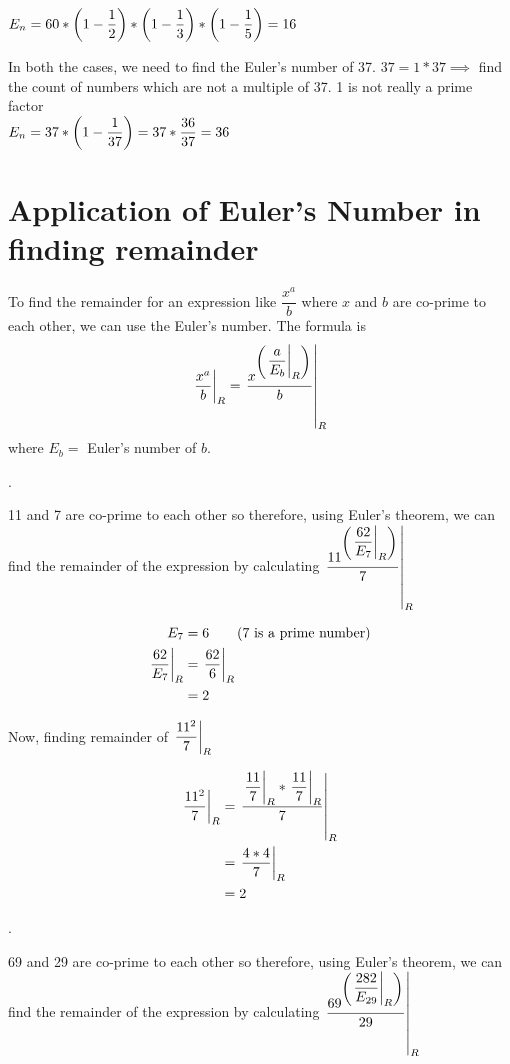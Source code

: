 $E_n = 60 * \left ( 1 - \dfrac{1}{2} \right ) * \left ( 1 - \dfrac{1}{3} \right ) * \left ( 1 - \dfrac{1}{5} \right ) = 16$


In both the cases, we need to find the Euler's number of 37. $37 = 1 * 37 \implies$ find the count of numbers which are not a multiple of 37. 1 is not really a prime factor \\

$E_n = 37 * \left ( 1 - \dfrac{1}{37} \right )  = 37 * \dfrac{36}{37} = 36$

\section{Application of Euler's Number in finding remainder}

To find the remainder for an expression like $\dfrac{x^a}{b}$ where $x$ and $b$ are co-prime to each other, we can use the Euler's number. The formula is 
$$
  \displaystyle{ \left. \frac{x^a}{b} \right |_{R} }  = \displaystyle{ \left. \frac{x^{  \left ( \displaystyle{ \left. \frac{a}{E_b} \right |_{R} } \right ) } }{b} \right |_{R} }
$$ where $E_b = $ Euler's number of $b$. 

.

11 and 7 are co-prime to each other so therefore, using Euler's theorem, we can find the remainder of the expression by calculating $\displaystyle{ \left. \frac{11^{  \left ( \displaystyle{ \left. \frac{62}{E_7} \right |_{R} } \right ) } }{7} \right |_{R} }$

\begin{align*}
    E_7 &= 6 \tag{7 is a prime number} \\
    \displaystyle{ \left. \frac{62}{E_7} \right |_{R} } &= \displaystyle{ \left. \frac{62}{6} \right |_{R} } \\
    &= 2
\end{align*}

Now, finding remainder of $\displaystyle{ \left. \frac{11^{2}}{7} \right |_{R} }$

\begin{align*}
    \displaystyle{ \left. \frac{11^{2}}{7} \right |_{R} } &= \displaystyle{ \left. \frac{\displaystyle{ \left. \frac{11}{7} \right |_{R} } * \displaystyle{ \left. \frac{11}{7} \right |_{R} }}{7} \right |_{R} } \\
    &= \displaystyle{ \left. \frac{4 * 4}{7} \right |_{R} } \\
    &= 2 \\    
\end{align*}

.

69 and 29 are co-prime to each other so therefore, using Euler's theorem, we can find the remainder of the expression by calculating $\displaystyle{ \left. \frac{69^{  \left ( \displaystyle{ \left. \frac{282}{E_{29}} \right |_{R} } \right ) }}{29} \right |_{R} }$

